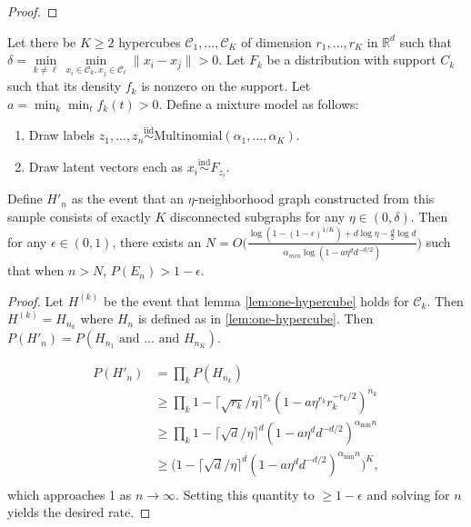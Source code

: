 \documentclass[12pt]{article}
\begin{document}
\begin{proof}
\end{proof}

\begin{lemma}
\label{lem:K-hypercubes}
Let there be $K \geq 2$ hypercubes $\mathcal{C}_1, ..., \mathcal{C}_K$ of dimension $r_1, ..., r_K$ in $\mathbb{R}^d$ such that $\delta = \min\limits_{k \neq \ell} \min\limits_{x_i \in \mathcal{C}_k, x_j \in \mathcal{C}_\ell} \|x_i - x_j\| > 0$. 
Let $F_k$ be a distribution with support $C_k$ such that its density $f_k$ is nonzero on the support. Let $a = \min_k \min_t f_k(t) > 0$. 
Define a mixture model as follows: 

\begin{enumerate}
  \item Draw labels $z_1, ..., z_n \stackrel{\mathrm{iid}}{\sim}\mathrm{Multinomial}(\alpha_1, ..., \alpha_K)$. 
  \item Draw latent vectors each as $x_i \stackrel{\mathrm{ind}}{\sim}F_{z_i}$.
\end{enumerate}

Define $H'_n$ as the event that an $\eta$-neighborhood graph constructed from this sample consists of exactly $K$ disconnected subgraphs for any $\eta \in (0, \delta)$. 
Then for any $\epsilon \in (0, 1)$, there exists an $N = O \Big( \frac{\log(1 - (1 - \epsilon)^{1/K}) + d \log \eta - \frac{d}{2} \log d}{\alpha_{min} \log(1 - a \eta^d d^{-d/2})} \Big)$ such that when $n > N$, $P(E_n) > 1 - \epsilon$. 
\end{lemma}

\begin{proof}
Let $H^{(k)}$ be the event that lemma \ref{lem:one-hypercube} holds for $\mathcal{C}_k$. Then $H^{(k)} = H_{n_k}$ where $H_n$ is defined as in \ref{lem:one-hypercube}. 
Then $P(H'_n) = P(H_{n_1} \text{ and } ... \text{ and } H_{n_K})$. 

$$
\begin{aligned}
P(H'_n) & = \prod_k P(H_{n_k}) \\
& \geq \prod_k 1 - \lceil \sqrt{r_k} / \eta \rceil^{r_k} (1 - a \eta^{r_k} r_k^{-r_k/2})^{n_k} \\
& \geq \prod_k 1 - \lceil \sqrt{d} / \eta \rceil^{d} (1 - a \eta^{d} d^{-d/2})^{\alpha_{\min} n} \\
& \geq \big(1 - \lceil \sqrt{d} / \eta \rceil^{d} (1 - a \eta^{d} d^{-d/2})^{\alpha_{\min} n} \big)^K, \\
\end{aligned}
$$
which approaches 1 as $n \to \infty$. 
Setting this quantity to $\geq 1 - \epsilon$ and solving for $n$ yields the desired rate. 
\end{proof}
\end{document}
